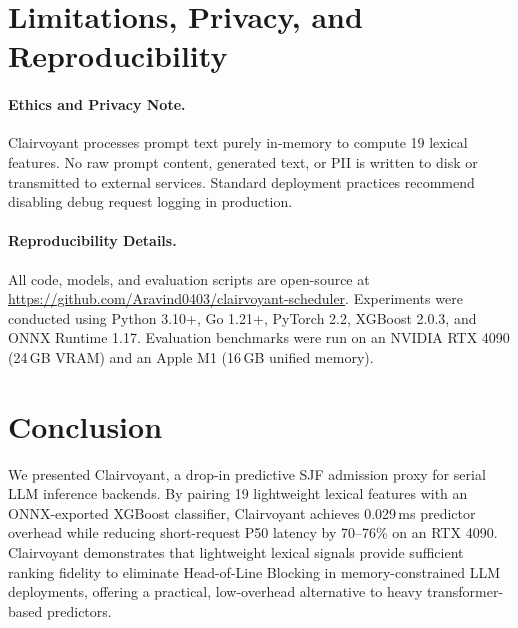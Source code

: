 \documentclass[10pt]{article}
\begin{document}
\section{Limitations, Privacy, and Reproducibility}
\label{sec:limitations}

\paragraph{Ethics and Privacy Note.}
Clairvoyant processes prompt text purely in-memory to compute 19 lexical features. No raw prompt content, generated text, or PII is written to disk or transmitted to external services. Standard deployment practices recommend disabling debug request logging in production.

\paragraph{Reproducibility Details.}
All code, models, and evaluation scripts are open-source at \url{https://github.com/Aravind0403/clairvoyant-scheduler}. Experiments were conducted using Python 3.10+, Go 1.21+, PyTorch 2.2, XGBoost 2.0.3, and ONNX Runtime 1.17. Evaluation benchmarks were run on an NVIDIA RTX 4090 (24\,GB VRAM) and an Apple M1 (16\,GB unified memory).

\section{Conclusion}
\label{sec:conclusion}

We presented Clairvoyant, a drop-in predictive SJF admission proxy for serial LLM inference backends. By pairing 19 lightweight lexical features with an ONNX-exported XGBoost classifier, Clairvoyant achieves 0.029\,ms predictor overhead while reducing short-request P50 latency by 70–76\% on an RTX 4090. Clairvoyant demonstrates that lightweight lexical signals provide sufficient ranking fidelity to eliminate Head-of-Line Blocking in memory-constrained LLM deployments, offering a practical, low-overhead alternative to heavy transformer-based predictors.
\end{document}
